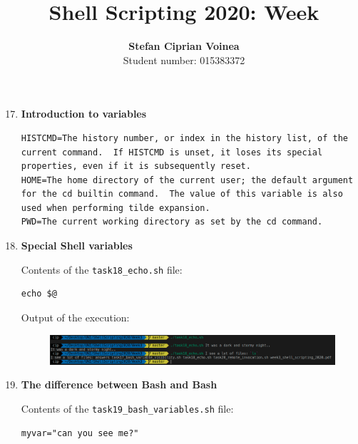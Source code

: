 \documentclass[9pt]{article}
\begin{document}
\title{Shell Scripting 2020: Week }
\author{\textbf{Stefan Ciprian Voinea}\\Student number: 015383372}
\maketitle


\begin{enumerate}
	
	\setcounter{enumi}{16}
	
	\item \textbf{Introduction to variables}
	
        \begin{lstlisting}[breaklines=true]
HISTCMD=The history number, or index in the history list, of the    current command.  If HISTCMD is unset, it loses its special properties, even if it is subsequently reset.
HOME=The home directory of the current user; the default argument for the cd builtin command.  The value of this variable is also used when performing tilde expansion.
PWD=The current working directory as set by the cd command.
		\end{lstlisting}
    
    \item \textbf{Special Shell variables}
    
        Contents of the \texttt{task18\_echo.sh} file:
        \begin{lstlisting}
echo $@
        \end{lstlisting}

        Output of the execution:

        \begin{figure}[h!]
            \centering
            \includegraphics[width=\linewidth]{img/18.png}
        \end{figure}

    \item \textbf{The difference between Bash and Bash}
    
        Contents of the \texttt{task19\_bash\_variables.sh} file:
        \begin{lstlisting}
myvar="can you see me?"


\end{lstlisting}
\end{enumerate}
\end{document}
